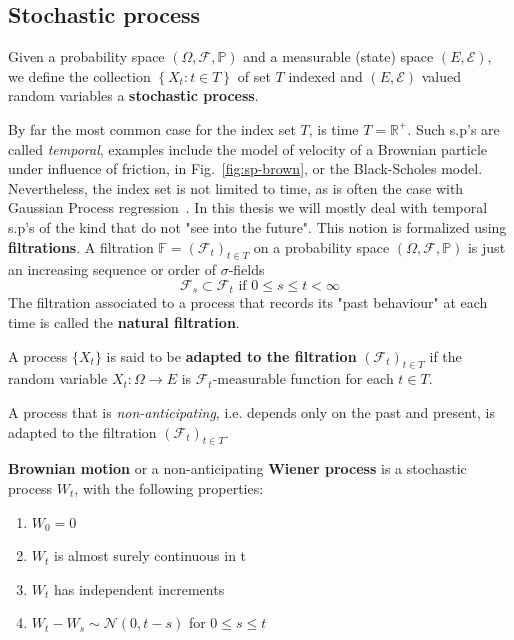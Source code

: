 \subsection{Stochastic process}
\begin{definition}
		Given a probability space $(\Omega, \mathcal{F}, \mathbb{P})$ and a measurable (state) space $(E, \mathcal{E})$, we define the collection $\left\{X_{t}: t \in T\right\}$ of set $T$ indexed and $(E, \mathcal{E})$ valued random variables a \textbf{stochastic process}.
\end{definition}
By far the most common case for the index set $T$, is time $T = \mathbb{R}^+$. Such s.p's are called \emph{temporal}, examples include the model of velocity of a Brownian particle under influence of friction, in Fig.~\ref{fig:sp-brown}, or the Black-Scholes model. Nevertheless, the index set is not limited to time, as is often the case with Gaussian Process regression~\cite{rasmussen2006gaussian}. In this thesis we will mostly deal with temporal s.p's of the kind that do not "see into the future". This notion is formalized using \textbf{filtrations}. A filtration $\mathbb{F}=\left(\mathcal{F}_{t}\right)_{t \in T}$ on a probability space $(\Omega, \mathcal{F}, \mathbb{P})$ is just an increasing sequence or order of $\sigma$-fields
\begin{equation}
	\mathcal{F}_{s} \subset \mathcal{F}_{t} \text { if } 0 \leq s \leq t<\infty
\end{equation}
The filtration associated to a process that records its "past behaviour" at each time is called the \textbf{natural filtration}. 
\begin{definition}
	A process $\{X_t\}$ is said to be \textbf{adapted to the filtration} $\left(\mathcal{F}_{t}\right)_{t \in T}$ if the random variable $X_t : \Omega \rightarrow E$ is $\mathcal{F}_t$-measurable function for each $t \in T$. 
\end{definition}
A process that is \emph{non-anticipating}, i.e. depends only on the past and present, is adapted to the filtration $\left(\mathcal{F}_{t}\right)_{t \in T}$.
\begin{definition}
	\textbf{Brownian motion} or a non-anticipating \textbf{Wiener process} is a stochastic process $W_t$, with the following properties:
	\begin{enumerate}[label=\roman*)]
		\item $W_0 = 0$
		\item $W_t$ is almost surely continuous in t
		\item $W_t$ has independent increments
		\item $W_t - W_s \sim \mathcal{N} (0, t-s)$ for $0 \leq s \leq t$
	\end{enumerate}
\end{definition}
